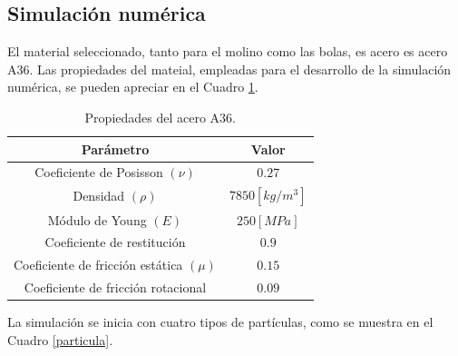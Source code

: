 \newpage

\begin{center}
	\section{Simulaci\'on num\'erica}
\end{center}

\noindent
\justify

El material seleccionado, tanto para el molino como las bolas, es acero es acero A36. Las propiedades del mateial, empleadas para el desarrollo de la simulaci\'on num\'erica, se pueden apreciar en el Cuadro \ref{data}.

\begin{table}[h!]
\centering
\begin{tabular}{c c}
\hline
\textbf{Par\'ametro} &  \textbf{Valor} \\ \hline
Coeficiente de Posisson $(\nu )$ & $0.27$ \\ \hline
Densidad $(\rho )$ & $7850 \left[kg/m^3 \right]$ \\ \hline
M\'odulo de Young $(E )$ & $250 [MPa]$ \\ \hline
Coeficiente de restituci\'on & $0.9$ \\ \hline
Coeficiente de fricci\'on est\'atica $(\mu )$ & $0.15$ \\ \hline
Coeficiente de fricci\'on rotacional & $0.09$ \\ \hline
\end{tabular}
\caption{Propiedades del acero A36.}
\label{data}
\end{table}

\vspace{-0.5cm}

\noindent
\justify

La simulaci\'on se inicia con cuatro tipos de part\'iculas, como se muestra en el Cuadro \ref{particula}.

